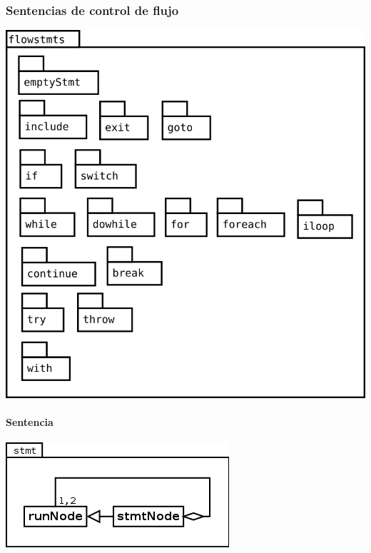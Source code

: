 \subsubsection{Sentencias de control de flujo}
\begin{center}
\includegraphics[scale=0.4]{flowstmts.png} \\
\end{center}

\paragraph{Sentencia}
\begin{center}
\includegraphics[scale=0.4]{stmt.png} \\
\end{center}

